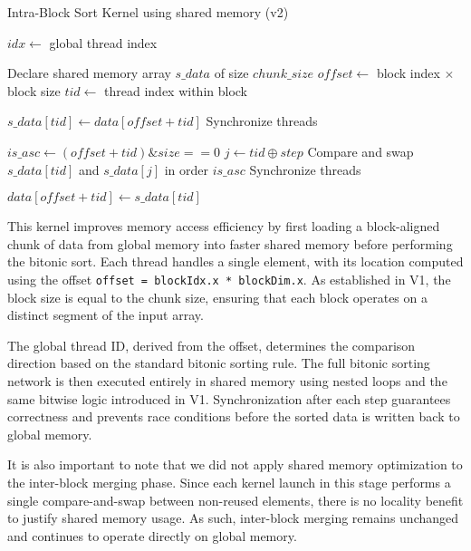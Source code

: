 \documentclass{article}
\begin{document}
\begin{algorithm}[H]
\caption{Intra-Block Sort Kernel using shared memory (v2)}
\begin{algorithmic}[1]
    \State $idx \gets$ global thread index
     \Return \EndIf

    \State Declare shared memory array $s\_data$ of size $chunk\_size$
    \State $offset \gets$ block index $\times$ block size
    \State $tid \gets$ thread index within block

    \State $s\_data[tid] \gets data[offset + tid]$ 
    \State Synchronize threads

        \State $is\_asc \gets (offset + tid) \& size == 0$
            \State $j \gets tid \oplus step$
                \State Compare and swap $s\_data[tid]$ and $s\_data[j]$ in order $is\_asc$
            \EndIf
            \State Synchronize threads
        \EndFor
    \EndFor

    \State $data[offset + tid] \gets s\_data[tid]$ 
\EndProcedure
\end{algorithmic}
\end{algorithm}

This kernel improves memory access efficiency by first loading a block-aligned chunk of data from global 
memory into faster shared memory before performing the bitonic sort. Each thread handles a single element, 
with its location computed using the offset \texttt{offset = blockIdx.x * blockDim.x}. As established in V1, 
the block size is equal to the chunk size, ensuring that each block operates on a distinct segment of the 
input array.

The global thread ID, derived from the offset, determines the comparison direction based on the standard 
bitonic sorting rule. The full bitonic sorting network is then executed entirely in shared memory using nested 
loops and the same bitwise logic introduced in V1. Synchronization after each step guarantees correctness and 
prevents race conditions before the sorted data is written back to global memory.

It is also important to note that we did not apply shared memory optimization to the inter-block merging phase. 
Since each kernel launch in this stage performs a single compare-and-swap between non-reused elements, there is 
no locality benefit to justify shared memory usage. As such, inter-block merging remains unchanged and continues 
to operate directly on global memory.
\end{document}
